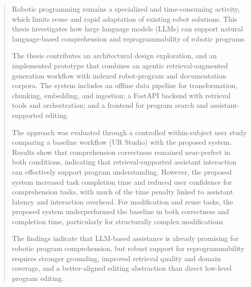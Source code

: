 \begin{abstract}
    Robotic programming remains a specialized and time-consuming activity, which limits reuse and rapid adaptation of existing robot solutions. This thesis investigates how large language models (LLMs) can support natural language-based comprehension and reprogrammability of robotic programs.

    The thesis contributes an architectural design exploration, and an implemented prototype that combines an agentic retrieval-augmented generation workflow with indexed robot-program and documentation corpora. The system includes an offline data pipeline for transformation, chunking, embedding, and ingestion; a FastAPI backend with retrieval tools and orchestration; and a frontend for program search and assistant-supported editing.

    The approach was evaluated through a controlled within-subject user study comparing a baseline workflow (UR Studio) with the proposed system. Results show that comprehension correctness remained near-perfect in both conditions, indicating that retrieval-supported assistant interaction can effectively support program understanding. However, the proposed system increased task completion time and reduced user confidence for comprehension tasks, with much of the time penalty linked to assistant latency and interaction overhead. For modification and reuse tasks, the proposed system underperformed the baseline in both correctness and completion time, particularly for structurally complex modifications.

    The findings indicate that LLM-based assistance is already promising for robotic program comprehension, but robust support for reprogrammability requires stronger grounding, improved retrieval quality and domain coverage, and a better-aligned editing abstraction than direct low-level program editing.
\end{abstract}